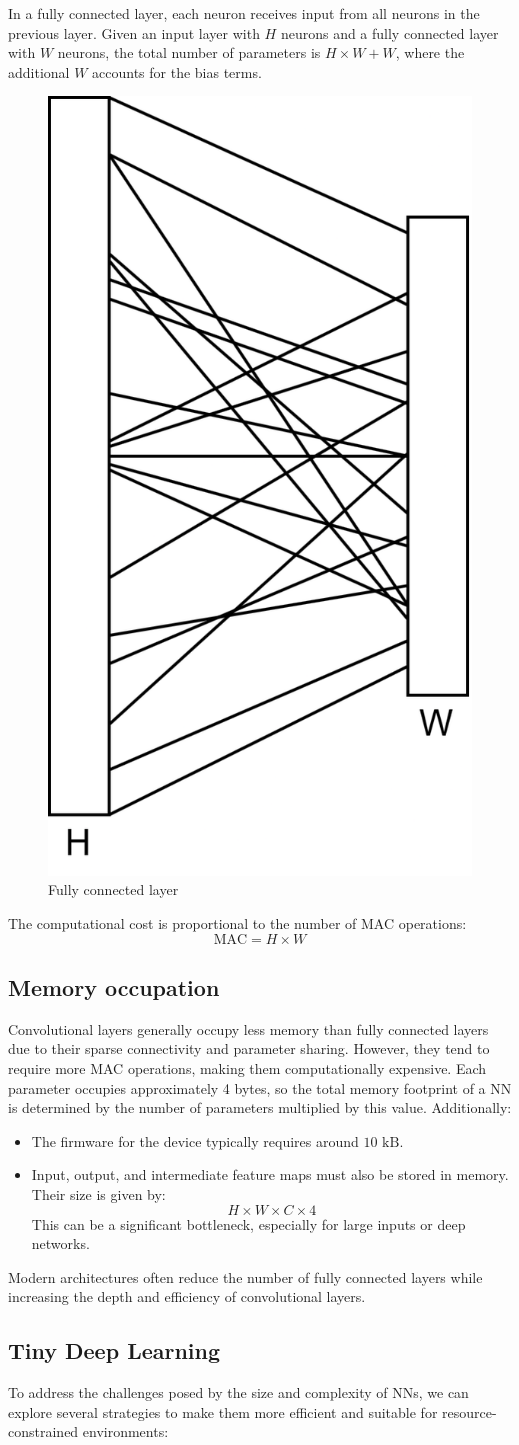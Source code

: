 In a fully connected layer, each neuron receives input from all neurons in the previous layer. 
Given an input layer with $H$ neurons and a fully connected layer with $W$ neurons, the total number of parameters is $H\times W+W$, where the additional $W$ accounts for the bias terms.
\begin{figure}[H]
    \centering
    \includegraphics[width=0.25\linewidth]{images/eeai8.png}
    \caption{Fully connected layer}
\end{figure}
The computational cost is proportional to the number of MAC operations:
\[\text{MAC}=H\times W\]

\subsection{Memory occupation}
Convolutional layers generally occupy less memory than fully connected layers due to their sparse connectivity and parameter sharing. 
However, they tend to require more MAC operations, making them computationally expensive. 
Each parameter occupies approximately 4 bytes, so the total memory footprint of a NN is determined by the number of parameters multiplied by this value.
Additionally:
\begin{itemize}
    \item The firmware for the device typically requires around $10\text{ kB}$.
    \item Input, output, and intermediate feature maps must also be stored in memory. 
        Their size is given by:
        \[H\times W \times C\times 4\]
        This can be a significant bottleneck, especially for large inputs or deep networks.
\end{itemize}
\noindent Modern architectures often reduce the number of fully connected layers while increasing the depth and efficiency of convolutional layers.

\subsection{Tiny Deep Learning}
To address the challenges posed by the size and complexity of NNs, we can explore several strategies to make them more efficient and suitable for resource-constrained environments:

